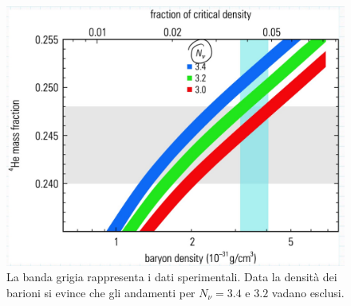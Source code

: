 \begin{figure}[!h]
    \centering
    \includegraphics[scale=0.2]{Immagini/0315_heliummassfraction2.png}
    \caption{La banda grigia rappresenta i dati sperimentali. Data la densità dei barioni si evince che gli andamenti per $N_\nu = 3.4$ e $3.2$ vadano esclusi.}
    \label{0315_Hefrac2}
\end{figure}



